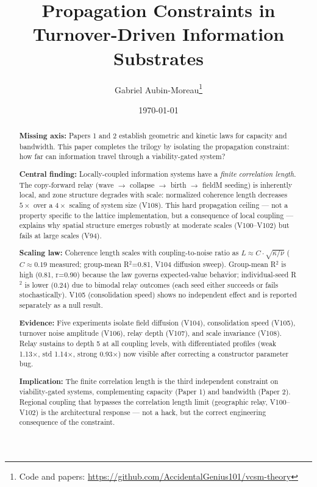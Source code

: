 \documentclass[11pt]{article}
\title{Propagation Constraints in Turnover-Driven Information Substrates}
\author{Gabriel Aubin-Moreau\thanks{Code and papers: \url{https://github.com/AccidentalGenius101/vcsm-theory}}}
\date{\today}
\begin{document}
\maketitle

\begin{abstract}
\noindent\textbf{Missing axis:} Papers 1 and 2 establish geometric and kinetic laws for capacity and bandwidth. This paper completes the trilogy by isolating the propagation constraint: how far can information travel through a viability-gated system?

\noindent\textbf{Central finding:} Locally-coupled information systems have a \emph{finite correlation length}. The copy-forward relay (wave $\to$ collapse $\to$ birth $\to$ fieldM seeding) is inherently local, and zone structure degrades with scale: normalized coherence length decreases $5\times$ over a $4\times$ scaling of system size (V108). This hard propagation ceiling — not a property specific to the lattice implementation, but a consequence of local coupling — explains why spatial structure emerges robustly at moderate scales (V100--V102) but fails at large scales (V94).

\noindent\textbf{Scaling law:} Coherence length scales with coupling-to-noise ratio as $L \approx C \cdot \sqrt{\kappa / \nu}$ ($C \approx 0.19$ measured; group-mean R$^2$=0.81, V104 diffusion sweep). Group-mean R$^2$ is high (0.81, r=0.90) because the law governs expected-value behavior; individual-seed R$^2$ is lower (0.24) due to bimodal relay outcomes (each seed either succeeds or fails stochastically). V105 (consolidation speed) shows no independent effect and is reported separately as a null result.

\noindent\textbf{Evidence:} Five experiments isolate field diffusion (V104), consolidation speed (V105), turnover noise amplitude (V106), relay depth (V107), and scale invariance (V108). Relay sustains to depth 5 at all coupling levels, with differentiated profiles (weak 1.13×, std 1.14×, strong 0.93×) now visible after correcting a constructor parameter bug.

\noindent\textbf{Implication:} The finite correlation length is the third independent constraint on viability-gated systems, complementing capacity (Paper 1) and bandwidth (Paper 2). Regional coupling that bypasses the correlation length limit (geographic relay, V100--V102) is the architectural response — not a hack, but the correct engineering consequence of the constraint.
\end{abstract}
\end{document}
